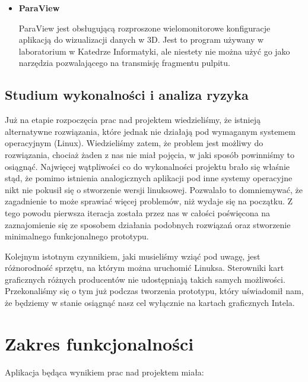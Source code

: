 \begin{itemize}
      \item \textbf{ParaView} \cite{ProjParaView}

        ParaView jest obsługującą rozproszone wielomonitorowe konfiguracje aplikacją do wizualizacji danych w 3D. Jest to program używany w laboratorium w Katedrze Informatyki, ale niestety nie można użyć go jako narzędzia pozwalającego na transmisję fragmentu pulpitu.

    \end{itemize}

  \subsection{Studium wykonalności i analiza ryzyka}

    Już na etapie rozpoczęcia prac nad projektem wiedzieliśmy, że istnieją alternatywne rozwiązania, które jednak nie działają pod wymaganym systemem operacyjnym (Linux). Wiedzieliśmy zatem, że problem jest możliwy do rozwiązania, chociaż żaden z nas nie miał pojęcia, w jaki sposób powinniśmy to osiągnąć. Najwięcej wątpliwości co do wykonalności projektu brało się właśnie stąd, że pomimo istnienia analogicznych aplikacji pod inne systemy operacyjne nikt nie pokusił się o stworzenie wersji linuksowej. Pozwalało to domniemywać, że zagadnienie to może sprawiać więcej problemów, niż wydaje się na początku. Z tego powodu pierwsza iteracja została przez nas w całości poświęcona na zaznajomienie się ze sposobem działania podobnych rozwiązań oraz stworzenie minimalnego funkcjonalnego prototypu.

    Kolejnym istotnym czynnikiem, jaki musieliśmy wziąć pod uwagę, jest różnorodność sprzętu, na którym można uruchomić Linuksa. Sterowniki kart graficznych różnych producentów nie udostępniają takich samych możliwości. Przekonaliśmy się o tym już podczas tworzenia prototypu, który uświadomił nam, że będziemy w stanie osiągnąć nasz cel wyłącznie na kartach graficznych Intela.

    \vfill
    \pagebreak

\section{Zakres funkcjonalności}

  Aplikacja będąca wynikiem prac nad projektem miała:

